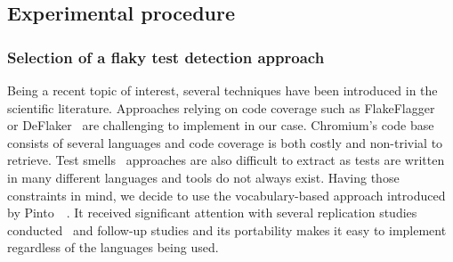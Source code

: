 \subsection{Experimental procedure}

\subsubsection{Selection of a flaky test detection approach} 
\label{sec:evaluationSelection}
Being a recent topic of interest, several techniques have been introduced in the scientific literature. Approaches relying on code coverage such as FlakeFlagger~\cite{alshammari2021flakeflagger} or DeFlaker~\cite{Bell2018} are challenging to implement in our case. Chromium's code base consists of several languages and code coverage is both costly and non-trivial to retrieve. Test smells~\cite{camara2021use} approaches are also difficult to extract as tests are written in many different languages and tools do not always exist. 
Having those constraints in mind, we decide to use the vocabulary-based approach introduced by Pinto~\etal ~\cite{Pinto2020}. It received significant attention with several replication studies conducted~\cite{Haben2021,Camara2021VocabExtendedReplication} and follow-up studies and its portability makes it easy to implement regardless of the languages being used.

